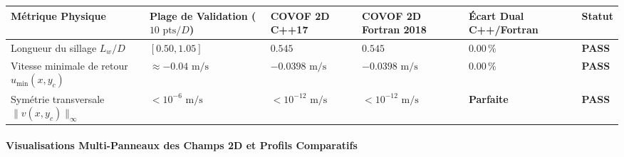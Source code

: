 \documentclass[
  10pt,
]{article}
\newcounter{none} %
\begin{document}
{\def\LTcaptype{none} %
\begin{longtable}[]{@{}
  >{\raggedright\arraybackslash}p{}
  >{\centering\arraybackslash}p{}
  >{\centering\arraybackslash}p{}
  >{\centering\arraybackslash}p{}
  >{\centering\arraybackslash}p{}
  >{\centering\arraybackslash}p{}@{}}
\toprule\noalign{}
\begin{minipage}[b]{\linewidth}\raggedright
Métrique Physique
\end{minipage} & \begin{minipage}[b]{\linewidth}\centering
Plage de Validation (\(10\text{ pts}/D\))
\end{minipage} & \begin{minipage}[b]{\linewidth}\centering
COVOF 2D C++17
\end{minipage} & \begin{minipage}[b]{\linewidth}\centering
COVOF 2D Fortran 2018
\end{minipage} & \begin{minipage}[b]{\linewidth}\centering
Écart Dual C++/Fortran
\end{minipage} & \begin{minipage}[b]{\linewidth}\centering
Statut
\end{minipage} \\
\midrule\noalign{}
\endhead
\bottomrule\noalign{}
\endlastfoot
Longueur du sillage \(L_w / D\) & \([0.50, 1.05]\) & \textbf{\(0.545\)}
& \textbf{\(0.545\)} & \textbf{\(0.00\,\%\)} & \textbf{PASS} \\
Vitesse minimale de retour \(u_{\min}(x, y_c)\) &
\(\approx -0.04\text{ m/s}\) & \textbf{\(-0.0398\text{ m/s}\)} &
\textbf{\(-0.0398\text{ m/s}\)} & \textbf{\(0.00\,\%\)} &
\textbf{PASS} \\
Symétrie transversale \(\|v(x, y_c)\|_\infty\) &
\(< 10^{-6}\text{ m/s}\) & \textbf{\(< 10^{-12}\text{ m/s}\)} &
\textbf{\(< 10^{-12}\text{ m/s}\)} & \textbf{Parfaite} &
\textbf{PASS} \\
\end{longtable}
}

\paragraph{Visualisations Multi-Panneaux des Champs 2D et Profils
Comparatifs}\label{visualisations-multi-panneaux-des-champs-2d-et-profils-comparatifs-6}
\end{document}
